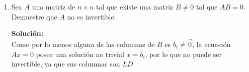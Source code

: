 \documentclass[12pt]{article}
\newenvironment{solucion}
{\begin{mdframed}[backgroundcolor=black!10]
		{\bf Solución:}\\
	}
	{
	\end{mdframed}
}
\newenvironment{preguntas}
{\begin{enumerate}\itemsep12pt
	}
	{
	\end{enumerate}
}
\begin{document}
\begin{preguntas}
\begin{solucion}
Busquemos en primer lugar, un vector que anule las columnas de $A$. Sea
$$b = \begin{pmatrix}
b_1 \\ b_2 \\ b_3 \\ b_4
\end{pmatrix}$$
Debemos encontrar
$$Ab = 0$$
Esto es,
$$a_1b_1 + 2a_1 b_2 + a_2b_3 + (a_1-a_2)b_4 = 0$$
Reordenando,
$$(b_1 + 2b_2 + b_4)a_1 + (b_3 - b_4)a_2 = 0$$
Como $a_1$ y $a_2$ son $L.I.$, la única forma de solucionar esto es
$$\begin{array}{rcl}
b_1 + 2b_2 + b_4 & = & 0\\
b_3 - b_4 & = & 0
\end{array} 
\Longrightarrow
\begin{array}{rcl}
b_1 & = & -2b_2 - b_3\\
b_2 & = & b_2\\
b_3 & = & b_3\\
b_4 & = & b_3
\end{array}
\Longrightarrow
b = b_2\begin{pmatrix}
-2 \\ 1 \\ 0 \\ 0
\end{pmatrix} 
+
b_3\begin{pmatrix}
-1 \\ 0 \\ 1 \\ 1
\end{pmatrix}
$$
Luego, todos los vectores de esta forma cumplirán con $Ab = 0$. Como necesitamos dos vectores $L.I.$ que cumplan con esto, basta con tomar los dos vectores generadores de $b$ como las columnas de $B$, es decir
$$B = \begin{bmatrix}
-2 & -1\\
1 & 0\\
0 & 1 \\
0 & 1
\end{bmatrix}$$
\end{solucion}
\item Sea $A$ una matriz de $n \times n$ tal que existe una matriz $B \neq 0$ tal que $AB = 0$.\\
Demuestre que $A$ no es invertible.
\begin{solucion}
Como por lo menos alguna de las columnas de $B$ es $b_i \neq \vec{0}$, la ecuación $Ax = 0$ posee una solución no trivial $x = b_i$, por lo que no puede ser invertible, ya que sus columnas son $LD$

\end{solucion}
\end{preguntas}
\end{document}
